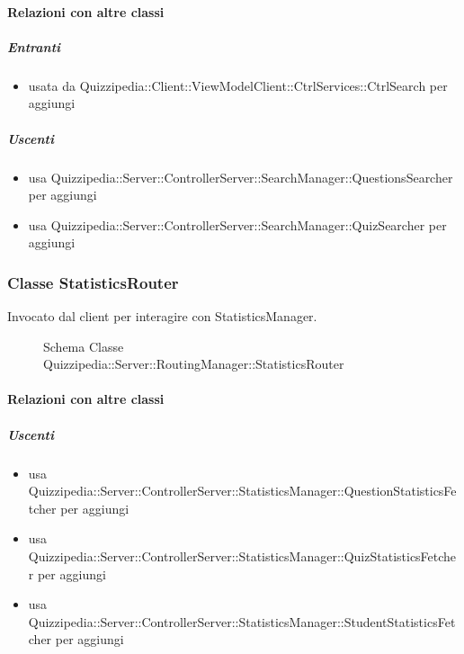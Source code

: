 \paragraph{Relazioni con altre classi}
\subparagraph{Entranti}
\begin{itemize}
\item usata da Quizzipedia::Client::ViewModelClient::CtrlServices::CtrlSearch per aggiungi
\end{itemize}
\subparagraph{Uscenti}
\begin{itemize}
\item usa Quizzipedia::Server::ControllerServer::SearchManager::QuestionsSearcher per aggiungi
\item usa Quizzipedia::Server::ControllerServer::SearchManager::QuizSearcher per aggiungi
\end{itemize}
\subsubsection{Classe StatisticsRouter}
Invocato dal client per interagire con StatisticsManager.
\begin{figure}[H]
\centering
\noindent{}
\caption[Schema Classe StatisticsRouter]{Schema Classe Quizzipedia::Server::RoutingManager::StatisticsRouter}
\end{figure}
\paragraph{Relazioni con altre classi}
\subparagraph{Uscenti}
\begin{itemize}
\item usa Quizzipedia::Server::ControllerServer::StatisticsManager::QuestionStatisticsFetcher per aggiungi
\item usa Quizzipedia::Server::ControllerServer::StatisticsManager::QuizStatisticsFetcher per aggiungi
\item usa Quizzipedia::Server::ControllerServer::StatisticsManager::StudentStatisticsFetcher per aggiungi
\end{itemize}
